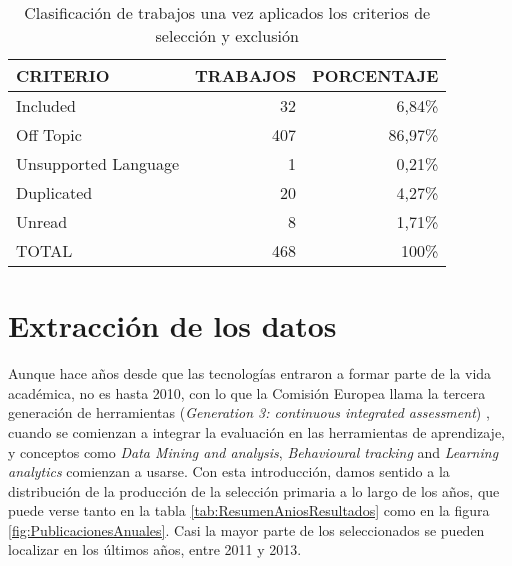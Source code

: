 

\begin{table}[H]
  \begin{center}
  \begin{tabular}{| m{4cm} | r | r |}
    \hline
    CRITERIO & TRABAJOS & PORCENTAJE\\
    \hline
    \hline 
    Included & 32 & 6,84\% \\
    \hline
    Off Topic & 407 & 86,97\% \\
    \hline
    Unsupported Language & 1 & 0,21\% \\
    \hline
    Duplicated & 20 & 4,27\% \\
    \hline
    Unread & 8 & 1,71\% \\
    \hline
    TOTAL & 468 & 100\% \\
    \hline
  \end{tabular}
\end{center}
\caption{Clasificación de trabajos una vez aplicados los criterios de selección y exclusión}
\label{tab:ResumenSelecccionResultados}
\end{table} 


\section{Extracción de los datos}

Aunque hace años desde que las tecnologías entraron a formar parte de la vida académica, no es hasta 2010, con lo que la Comisión Europea llama la tercera generación de herramientas (\emph{Generation 3: continuous integrated assessment}) \cite{Redecker:2013}, cuando se comienzan a integrar la evaluación en las herramientas de aprendizaje, y conceptos como \emph{Data Mining and analysis}, \emph{Behavioural tracking} and \emph{Learning analytics} comienzan a usarse. Con esta introducción, damos sentido a la distribución de la producción de la selección primaria a lo largo de los años, que puede verse tanto en la tabla \ref{tab:ResumenAniosResultados} como en la figura \ref{fig:PublicacionesAnuales}. Casi la mayor parte de los seleccionados se pueden localizar en los últimos años, entre 2011 y 2013.


